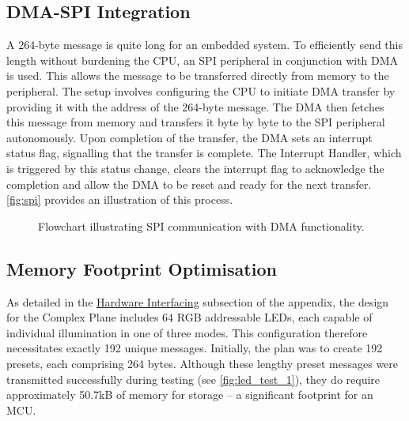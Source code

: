 \documentclass[12pt]{article}
\numberwithin{subsubsubsection}{subsubsection}
\begin{document}
\subsection{DMA-SPI Integration}

A 264-byte message is quite long for an embedded system. To efficiently send this length without burdening the CPU, an SPI peripheral in conjunction with DMA is used. This allows the message to be transferred directly from memory to the peripheral. The setup involves configuring the CPU to initiate DMA transfer by providing it with the address of the 264-byte message. The DMA then fetches this message from memory and transfers it byte by byte to the SPI peripheral autonomously. Upon completion of the transfer, the DMA sets an interrupt status flag, signalling that the transfer is complete. The Interrupt Handler, which is triggered by this status change, clears the interrupt flag to acknowledge the completion and allow the DMA to be reset and ready for the next transfer. \autoref{fig:spi} provides an illustration of this process.

\begin{figure}[ht]
    \centering
    \caption{Flowchart illustrating SPI communication with DMA functionality.}
    \label{fig:spi}
\end{figure}


\subsection{Memory Footprint Optimisation}

As detailed in the \hyperref[appendix:hardwareinterfacing]{Hardware Interfacing} subsection of the appendix, the design for the Complex Plane includes 64 RGB addressable LEDs, each capable of individual illumination in one of three modes. This configuration therefore necessitates exactly 192 unique messages. Initially, the plan was to create 192 presets, each comprising 264 bytes. Although these lengthy preset messages were transmitted successfully during testing (see \autoref{fig:led_test_1}), they do require approximately 50.7kB of memory for storage – a significant footprint for an MCU.
\end{document}
